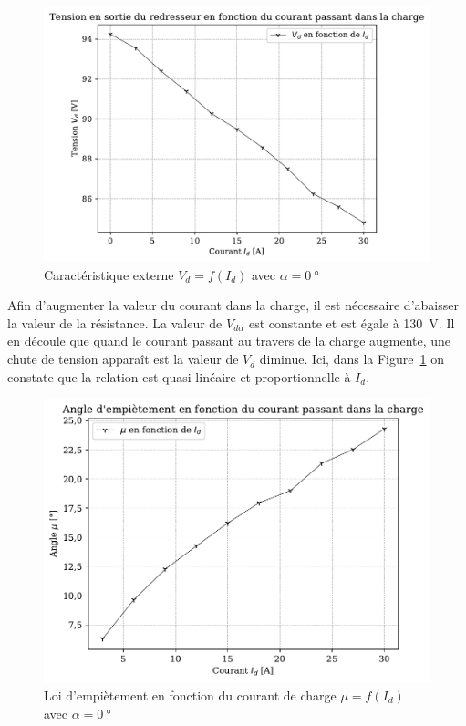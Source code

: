 \documentclass[a4paper, 11pt, openany, oneside, french]{article}
\begin{document}
\begin{figure}[!ht]
    \centering
    \includegraphics[width=0.8\linewidth]{exp1_graph1}
    \caption{Caractéristique externe $V_d=f\left(I_d\right)$ avec $\alpha = \SI{0}{\degree}$}
    \label{fig:exp1grap1}
\end{figure}

Afin d'augmenter la valeur du courant dans la charge, il est nécessaire d'abaisser la valeur de la résistance. La valeur de $V_{d\alpha}$ est constante et est égale à \SI{130}{\volt}. Il en découle que quand le courant passant au travers de la charge augmente, une chute de tension apparaît est la valeur de $V_d$ diminue. Ici, dans la Figure~\ref{fig:exp1grap1} on constate que la relation est quasi linéaire et proportionnelle à $I_d$.

\begin{figure}[!ht]
    \centering
    \includegraphics[width=0.8\linewidth]{exp1_graph2}
    \caption{Loi d'empiètement en fonction du courant de charge $\mu=f\left(I_d\right)$ avec $\alpha = \SI{0}{\degree}$}
    \label{fig:exp1grap2}
\end{figure}
\end{document}

